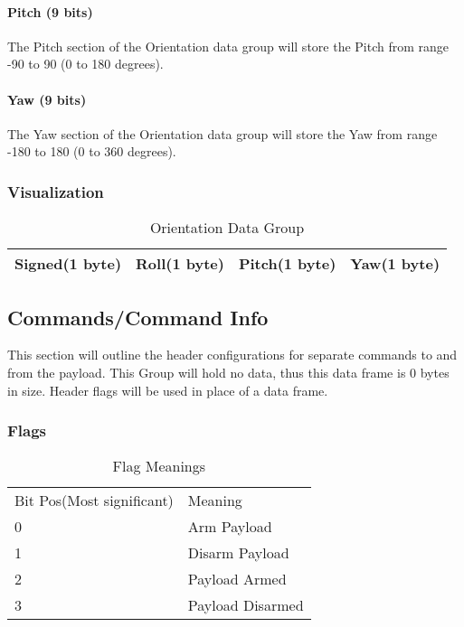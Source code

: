 \documentclass{article}
\begin{document}
  \paragraph{Pitch (9 bits)}
  The Pitch section of the Orientation data group will store the Pitch from range -90 to 90 (0 to 180 degrees).  
  \paragraph{Yaw (9 bits)}
  The Yaw section of the Orientation data group will store the Yaw from range -180 to 180 (0 to 360 degrees).  
  
  \subsubsection{Visualization}
  \begin{table}[H]
  \centering
  \caption{Orientation Data Group}
  \label{Orientation}
  \begin{tabular}{|l|l|l|l|}
  \hline
Signed(1 byte) & Roll(1 byte) & Pitch(1 byte) & Yaw(1 byte) \\ \hline
  \end{tabular}
  \end{table}
  
 \pagebreak  
  
  \subsection{Commands/Command Info}
  This section will outline the header configurations for separate commands to and from the payload. This Group will hold no data, thus this data frame is 0 bytes in size. Header flags will be used in place of a data frame.
  \subsubsection{Flags}

  \begin{table}[h]
  \centering
  \caption{Flag Meanings}
  \begin{tabular}{ll}
    Bit Pos(Most significant) & Meaning \\
  0     & Arm Payload \\
  1     & Disarm Payload     \\
  2     & Payload Armed        \\
  3     & Payload Disarmed       \\
  \end{tabular}
  \end{table}
  
\end{document}

